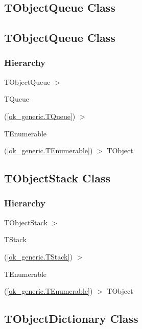\documentclass{report}
\newif\ifpdf
\begin{document}
\subsection*{\large{\textbf{TObjectQueue Class}}\normalsize\hspace{1ex}\hrulefill}
\else
\subsection*{TObjectQueue Class}
\fi
\label{ok_generic.TObjectQueue}
\subsubsection*{\large{\textbf{Hierarchy}}\normalsize\hspace{1ex}\hfill}
TObjectQueue {$>$} \begin{ttfamily}TQueue\end{ttfamily}(\ref{ok_generic.TQueue}) {$>$} \begin{ttfamily}TEnumerable\end{ttfamily}(\ref{ok_generic.TEnumerable}) {$>$} 
TObject
\ifpdf
\subsection*{\large{\textbf{TObjectStack Class}}\normalsize\hspace{1ex}\hrulefill}
\else
\subsection*{TObjectStack Class}
\fi
\label{ok_generic.TObjectStack}
\subsubsection*{\large{\textbf{Hierarchy}}\normalsize\hspace{1ex}\hfill}
TObjectStack {$>$} \begin{ttfamily}TStack\end{ttfamily}(\ref{ok_generic.TStack}) {$>$} \begin{ttfamily}TEnumerable\end{ttfamily}(\ref{ok_generic.TEnumerable}) {$>$} 
TObject
\ifpdf
\subsection*{\large{\textbf{TObjectDictionary Class}}\normalsize\hspace{1ex}\hrulefill}
\else
\end{document}
